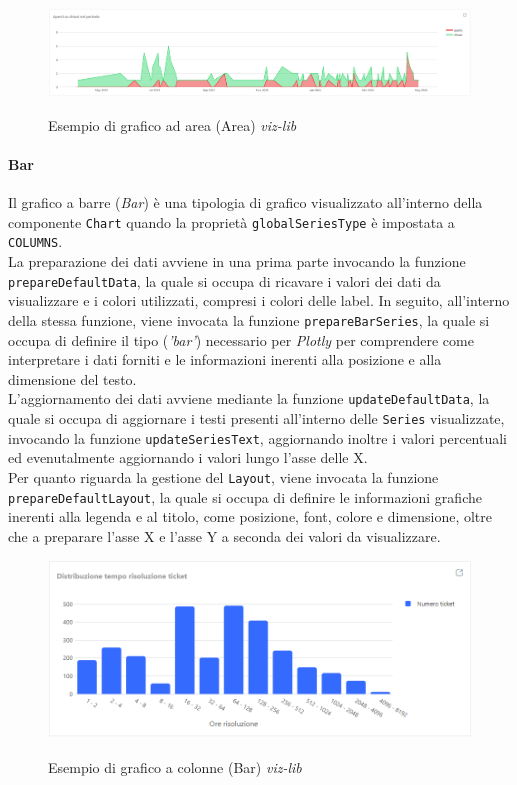\begin{figure}[H]
    \centering
    \includegraphics[alt={Esempio di grafico ad area viz-lib}, width=1 \columnwidth, height=\maxdimen, keepaspectratio]{img/ex_area.png}
    \caption{Esempio di grafico ad area (Area) \textit{viz-lib}}
    \label{fig:area-example}
\end{figure}

\paragraph{Bar}
Il grafico a barre (\textit{Bar}) è una tipologia di grafico visualizzato all'interno della componente \texttt{Chart} quando la proprietà \texttt{globalSeriesType} è impostata a \texttt{COLUMNS}. \\
La preparazione dei dati avviene in una prima parte invocando la funzione \texttt{prepareDefaultData}, la quale si occupa di ricavare i valori dei dati da visualizzare e i colori utilizzati, compresi i
colori delle label. In seguito, all'interno della stessa funzione, viene invocata la funzione \texttt{prepareBarSeries}, la quale si occupa di definire il tipo (\textit{'bar'}) necessario per \textit{Plotly} per comprendere
come interpretare i dati forniti e le informazioni inerenti alla posizione e alla dimensione del testo. \\
L'aggiornamento dei dati avviene mediante la funzione \texttt{updateDefaultData}, la quale si occupa di aggiornare i testi presenti all'interno delle \texttt{Series} visualizzate, invocando la funzione
\texttt{updateSeriesText}, aggiornando inoltre i valori percentuali ed evenutalmente aggiornando i valori lungo l'asse delle X. \\
Per quanto riguarda la gestione del \texttt{Layout}, viene invocata la funzione \texttt{prepareDefaultLayout}, la quale si occupa di definire le informazioni grafiche inerenti alla legenda e al titolo, come posizione,
font, colore e dimensione, oltre che a preparare l'asse X e l'asse Y a seconda dei valori da visualizzare.

\begin{figure}[H]
    \centering
    \includegraphics[alt={Esempio di grafico a colonne viz-lib}, width=0.8 \columnwidth, height=\maxdimen, keepaspectratio]{img/ex_bar.png}
    \caption{Esempio di grafico a colonne (Bar) \textit{viz-lib}}
    \label{fig:bar-example}
\end{figure}

